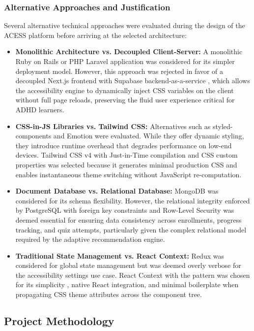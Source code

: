 \documentclass[12pt, oneside]{article} %
\newcommand{\tcode}[1]{\path{#1}}
\begin{document}
\subsubsection{Alternative Approaches and Justification}

Several alternative technical approaches were evaluated during the design of the ACESS platform before arriving at the selected architecture:

\begin{itemize}
    \item \textbf{Monolithic Architecture vs. Decoupled Client-Server:} A monolithic Ruby on Rails or PHP Laravel application was considered for its simpler deployment model. However, this approach was rejected in favor of a decoupled Next.js frontend \cite{nextjs_ssr} with Supabase backend-as-a-service \cite{supabase_docs}, which allows the accessibility engine to dynamically inject CSS variables on the client without full page reloads, preserving the fluid user experience critical for ADHD learners.
    \item \textbf{CSS-in-JS Libraries vs. Tailwind CSS:} Alternatives such as styled-components and Emotion were evaluated. While they offer dynamic styling, they introduce runtime overhead that degrades performance on low-end devices. Tailwind CSS v4 \cite{tailwind_docs} with Just-in-Time compilation and CSS custom properties was selected because it generates minimal production CSS and enables instantaneous theme switching without JavaScript re-computation.
    \item \textbf{Document Database vs. Relational Database:} MongoDB was considered for its schema flexibility. However, the relational integrity enforced by PostgreSQL with foreign key constraints and Row-Level Security \cite{supabase_rls} was deemed essential for ensuring data consistency across enrollments, progress tracking, and quiz attempts, particularly given the complex relational model required by the adaptive recommendation engine.
    \item \textbf{Traditional State Management vs. React Context:} Redux was considered for global state management but was deemed overly verbose for the accessibility settings use case. React Context with the \tcode{AccessibilityProvider} pattern was chosen for its simplicity \cite{react_docs}, native React integration, and minimal boilerplate when propagating CSS theme attributes across the component tree.
\end{itemize}

\subsection{Project Methodology}
\end{document}
